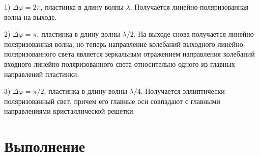 \documentclass[a4paper,12pt]{article}
\renewcommand{\phi}{\ensuremath{\varphi}}
\theoremstyle{plain} %
\theoremstyle{definition} %
\theoremstyle{remark} %
\begin{document}
\begin{enumerate}
1) $\Delta\phi = 2\pi$, пластинка в длину волны $\lambda$. Получается линейно-поляризованная волна на выходе.

2) $\Delta\phi = \pi$, пластинка в длину волны $\lambda/2$. На выходе снова получается линейно-поляризованная волна, но теперь направление колебаний выходного линейно-поляризованного света является зеркальным отражением направления колебаний входного линейно-поляризованного света относительно одного из главных направлений пластинки.

3)  $\Delta\phi = \pi/2$, пластинка в длину волны $\lambda/4$. Получается эллиптически поляризованный свет, причем его главные оси совпадают с главными направлениями кристаллической решетки.
\end{enumerate}
\section{Выполнение}
\end{document}
